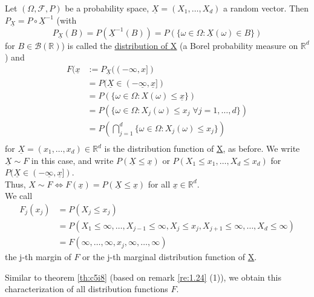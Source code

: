 \documentclass{article}
\newcommand{\R}{\mathbb{R}}
\newcommand{\inv}{^{-1}}
\begin{document}
	\begin{mydef}{}{}
		Let $(\Omega, \mathcal{F}, P)$ be a probability space, $\underline{X}=(X_1, \dots, X_d)$ a random vector. Then $P_{\underline{X}}=P\circ\underline{X}\inv$ (with $$P_{\underline{X}}(B)=P(\underline{X}\inv(B))=P(\{\omega\in\Omega : \underline{X}(\omega)\in B\})$$ for $B\in\mathcal{B}(\R)$) is called the \underline{distribution of \underline{X}} (a Borel probability measure on $\R^d$) and
		\begin{align*}
			F(\underline{x}&:=P_{\underline{X}}((-\infty, x])\\
			&=P(\underline{X}\in(-\underline{\infty}, \underline{x}])\\
			&=P(\{\omega\in\Omega : X(\omega)\leq\underline{x}\})\\
			&=P(\{\omega\in\Omega : X_j(\omega)\leq x_j\;\forall j=1, \dots, d\})\\
			&=P(\bigcap_{j=1}^{d}\{\omega\in\Omega : X_j(\omega)\leq x_j\})\\
		\end{align*}
		for $\underline{X}=(x_1, \dots, x_d)\in\R^d$ is the distribution function of \underline{X}, as before. We write $\underline{X}\sim F$ in this case, and write $P(\underline{X}\leq\underline{x})$ or $P(X_1\leq x_1, \dots, X_d\leq x_d)$ for $P(\underline{X}\in(-\underline{\infty}, \underline{x}])$.\\
		
		Thus, $X\sim F\Leftrightarrow F(\underline{x})=P(\underline{X}\leq\underline{x})$ for all $\underline{x}\in\R^d$.\\
		
		We call
		\begin{align*}
			F_j(x_j)&=P(X_j\leq x_j)\\
			&=P(X_1\leq\infty, \dots, X_{j-1}\leq\infty, X_j\leq x_j, X_{j+1}\leq\infty, \dots, X_d\leq\infty)\\
			&=F(\infty, \dots, \infty, x_j, \infty, \dots, \infty)
		\end{align*}
		the j-th margin of $F$ or the j-th marginal distribution function of \underline{X}.
	\end{mydef}
	
	Similar to theorem \ref{th:c5i8} (based on remark \ref{re:1.24} (1)), we obtain this characterization of all distribution functions $F$.
	
\end{document}

